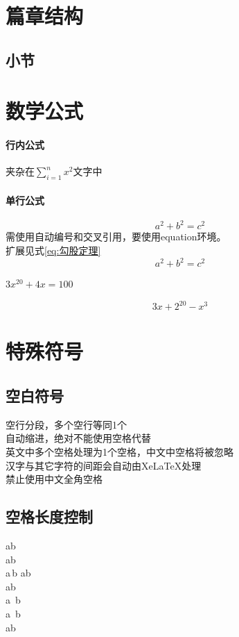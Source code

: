 \documentclass[UTF8]{article}  %
\begin{document}
\section{篇章结构}
\subsection{小节}


\section{数学公式}
\paragraph{行内公式}夹杂在$\sum_{i=1}^{n} {x^2}$文字中
\paragraph{单行公式}
$$a^2+b^2=c^2$$
需使用自动编号和交叉引用，要使用equation环境。\\
扩展见式\ref{eq:勾股定理}
\begin{equation}
	a^2+b^2=c^2 \label{eq:勾股定理}
\end{equation}

\(3x^{20}+4x=100\)

\[3x+2^20-x^3\]

\section{特殊符号}
\subsection{空白符号}
\noindent 空行分段，多个空行等同1个\\
自动缩进，绝对不能使用空格代替\\
英文中多个空格处理为1个空格，中文中空格将被忽略\\
汉字与其它字符的间距会自动由XeLaTeX处理\\
禁止使用中文全角空格\\
\subsection{空格长度控制}
a\quad b \\
a\qquad b \\
a\,b a\thinspace b \\
a\enspace b \\
a\ b \\
a~b \\
a\hfill b\\
\end{document}
